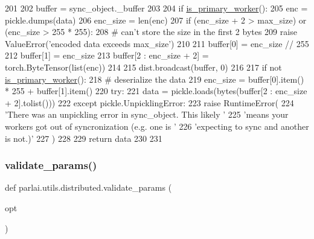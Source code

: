 \begin{DoxyCode}
201 
202     buffer = sync\_object.\_buffer
203 
204     \textcolor{keywordflow}{if} \hyperlink{namespaceparlai_1_1utils_1_1distributed_a9bb1dac198180590ef8c6b6c6f9fc2c4}{is\_primary\_worker}():
205         enc = pickle.dumps(data)
206         enc\_size = len(enc)
207         \textcolor{keywordflow}{if} (enc\_size + 2 > max\_size) \textcolor{keywordflow}{or} (enc\_size > 255 * 255):
208             \textcolor{comment}{# can't store the size in the first 2 bytes}
209             \textcolor{keywordflow}{raise} ValueError(\textcolor{stringliteral}{'encoded data exceeds max\_size'})
210 
211         buffer[0] = enc\_size // 255
212         buffer[1] = enc\_size %
213         buffer[2 : enc\_size + 2] = torch.ByteTensor(list(enc))
214 
215     dist.broadcast(buffer, 0)
216 
217     \textcolor{keywordflow}{if} \textcolor{keywordflow}{not} \hyperlink{namespaceparlai_1_1utils_1_1distributed_a9bb1dac198180590ef8c6b6c6f9fc2c4}{is\_primary\_worker}():
218         \textcolor{comment}{# deserialize the data}
219         enc\_size = buffer[0].item() * 255 + buffer[1].item()
220         \textcolor{keywordflow}{try}:
221             data = pickle.loads(bytes(buffer[2 : enc\_size + 2].tolist()))
222         \textcolor{keywordflow}{except} pickle.UnpicklingError:
223             \textcolor{keywordflow}{raise} RuntimeError(
224                 \textcolor{stringliteral}{'There was an unpickling error in sync\_object. This likely '}
225                 \textcolor{stringliteral}{'means your workers got out of syncronization (e.g. one is '}
226                 \textcolor{stringliteral}{'expecting to sync and another is not.)'}
227             )
228 
229     \textcolor{keywordflow}{return} data
230 
231 
\end{DoxyCode}
\mbox{\label{namespaceparlai_1_1utils_1_1distributed_afd854992e4cc6571b120b9e179cd4a7a}} 
\subsubsection{\texorpdfstring{validate\+\_\+params()}{validate\_params()}}
{\footnotesize\ttfamily def parlai.\+utils.\+distributed.\+validate\+\_\+params (\begin{DoxyParamCaption}\item[{}]{opt }\end{DoxyParamCaption})}

